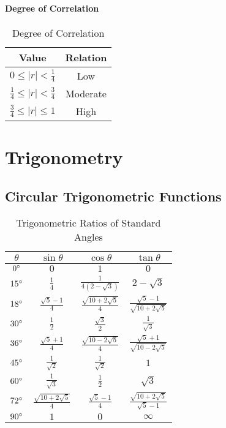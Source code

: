 \documentclass[openany, oneside]{book}
\begin{document}
\subsection{Degree of Correlation}
\begin{table}[H]
\begin{center}
\caption{Degree of Correlation}
\label{table2}
\begin{tabular}{c|c}
Value&Relation\\
\hline
$0\leq \lvert r \rvert < \frac{1}{4}$&Low\\
$\frac{1}{4} \leq \lvert r \rvert < \frac{3}{4}$&Moderate\\
$\frac{3}{4}\leq \lvert r \rvert \leq 1$&High\\
\end{tabular}
\end{center}
\end{table}

\part{Trigonometry}
\large{\chapter{Circular Trigonometric Functions}}
\begin{table}[H]
\begin{center}
\caption{Trigonometric Ratios of Standard Angles}
\label{table1}
\begin{tabular}{c|ccc}
$\theta$&$\sin \theta$&$\cos \theta$&$\tan \theta$\\
\hline
$0\degree$&$0$&$1$&$0$\\
$15\degree$&$\frac{1}{4}$&$\frac{1}{4(2-\sqrt{3})}$&$2-\sqrt{3}$\\
$18\degree$&$\frac{\sqrt{5}-1}{4}$&$\frac{\sqrt{10+2\sqrt{5}}}{4}$&$\frac{\sqrt{5}-1}{\sqrt{10+2\sqrt{5}}}$\\
$30\degree$&$\frac{1}{2}$&$\frac{\sqrt{3}}{2}$&$\frac{1}{\sqrt{3}}$\\
$36\degree$&$\frac{\sqrt{5}+1}{4}$&$\frac{\sqrt{10-2\sqrt{5}}}{4}$&$\frac{\sqrt{5}+1}{\sqrt{10-2\sqrt{5}}}$\\
$45\degree$&$\frac{1}{\sqrt{2}}$&$\frac{1}{\sqrt{2}}$&$1$\\
$60\degree$&$\frac{1}{\sqrt{3}}$&$\frac{1}{2}$&$\sqrt{3}$\\
$72\degree$&$\frac{\sqrt{10+2\sqrt{5}}}{4}$&$\frac{\sqrt{5}-1}{4}$&$\frac{\sqrt{10+2\sqrt{5}}}{\sqrt{5}-1}$\\
$90\degree$&$1$&$0$&$\infty$\\
\hline
\end{tabular}
\end{center}
\end{table}
\end{document}
